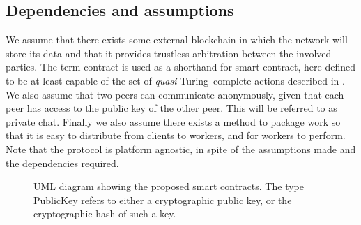 \subsection{Dependencies and assumptions}
\label{sec:res:dependencies}
We assume that there exists some external blockchain in which the network will store its data and that it provides trustless arbitration between the involved parties. The term contract is used as a shorthand for smart contract, here defined to be at least capable of the set of \textit{quasi}-Turing--complete actions described in . We also assume that two peers can communicate anonymously, given that each peer has access to the public key of the other peer. This will be referred to as private chat. Finally we also assume there exists a method to package work so that it is easy to distribute from clients to workers, and for workers to perform.
Note that the protocol is platform agnostic, in spite of the assumptions made and the dependencies required.

\begin{figure}[ht]
\centering
{}
\caption{UML diagram showing the proposed smart contracts. The type PublicKey refers to either a cryptographic public key, or the cryptographic hash of such a key.}
\label{fig:res:umal}
\end{figure}

